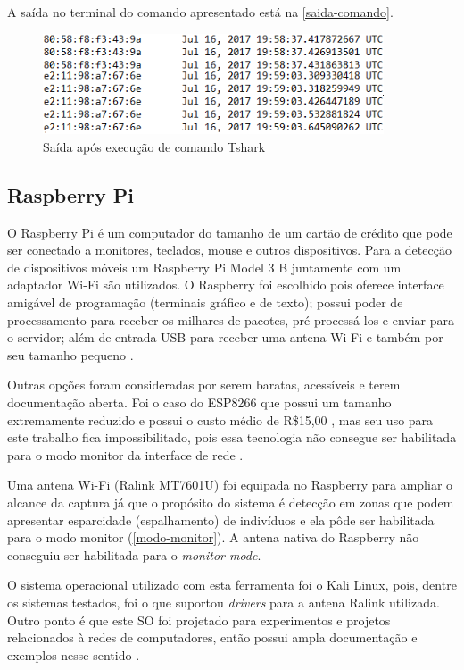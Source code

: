 A saída no terminal do comando apresentado está na \autoref{saida-comando}.

\begin{figure}[htb]
  \caption{\label{saida-comando}Saída após execução de comando Tshark}
  \begin{center}
    \includegraphics[width=0.90\textwidth]{img/packets.png}
  \end{center}
\end{figure}

\subsection{Raspberry Pi}
O Raspberry Pi é um computador do tamanho de um cartão de crédito que pode ser conectado a monitores, teclados, mouse e outros dispositivos.
Para a detecção de dispositivos móveis um Raspberry Pi Model 3 B juntamente com um adaptador Wi-Fi são utilizados. O Raspberry foi escolhido
pois oferece interface amigável de programação (terminais gráfico e de texto); possui poder de processamento para receber os milhares de pacotes, pré-processá-los
e enviar para o servidor; além de entrada USB para receber uma antena Wi-Fi e também por seu tamanho pequeno \cite{rpi2017}.

Outras opções foram consideradas por serem baratas, acessíveis e terem documentação aberta. Foi o caso do ESP8266 que possui um tamanho extremamente
reduzido e possui o custo médio de R\$15,00 \cite{Embarcados2015}, mas seu uso para este trabalho fica impossibilitado, pois essa tecnologia não consegue ser habilitada para o modo monitor da interface de rede \cite{Puhl2016} \cite{Ferreira2016}.

Uma antena Wi-Fi (Ralink MT7601U) foi equipada no Raspberry para ampliar o alcance da captura já que o propósito do sistema é detecção em zonas que podem
apresentar esparcidade (espalhamento) de indivíduos e ela pôde ser habilitada para o modo monitor (\autoref{modo-monitor}). A antena nativa
do Raspberry não conseguiu ser habilitada para o \emph{monitor mode}.

O sistema operacional utilizado com esta ferramenta foi o Kali Linux, pois,
dentre os sistemas testados, foi o que suportou \emph{drivers} para a antena
Ralink utilizada. Outro ponto é que este SO foi projetado para experimentos e
projetos relacionados à redes de computadores, então possui ampla documentação e exemplos nesse sentido
\cite{kali}.

